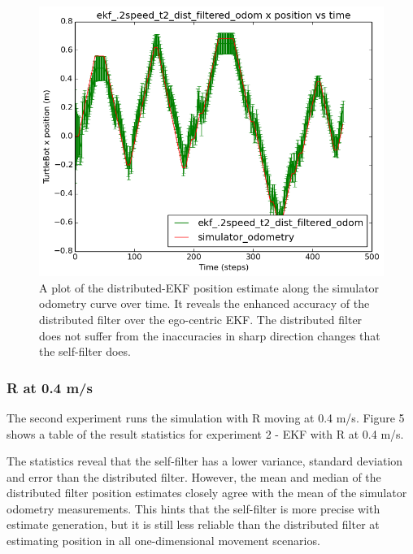 \documentclass[conference]{IEEEtran} \usepackage[T1]{fontenc} \usepackage[backend=biber, style=ieee]{biblatex}
\begin{document}
\begin{figure}[!ht]
\label{pic4} 
\centering 
\includegraphics[scale=.45]{ekf_2speed_t2_dist_filtered_odom_pos_err_graph}
\caption {A plot of the distributed-EKF position estimate along the simulator odometry curve over time. It 
reveals the enhanced accuracy of the distributed filter over the ego-centric EKF. The distributed filter does not suffer 
from the inaccuracies in sharp direction changes that the self-filter does.}
\end{figure}

\subsubsection{R at 0.4 m/s} \label{R at 0.4 m/s}
The second experiment runs the simulation with R moving at 0.4 m/s. Figure 5 shows a table of the result statistics for 
experiment 2 - EKF with R at 0.4 m/s. 


The statistics reveal that the self-filter has a lower variance, standard deviation and error than the distributed 
filter. However, the mean and median of the distributed filter position estimates closely agree with the mean of the 
simulator odometry measurements. This hints that the self-filter is more precise with estimate generation, but it is 
still less reliable than the distributed filter at estimating position in all one-dimensional movement scenarios.
\end{document}
